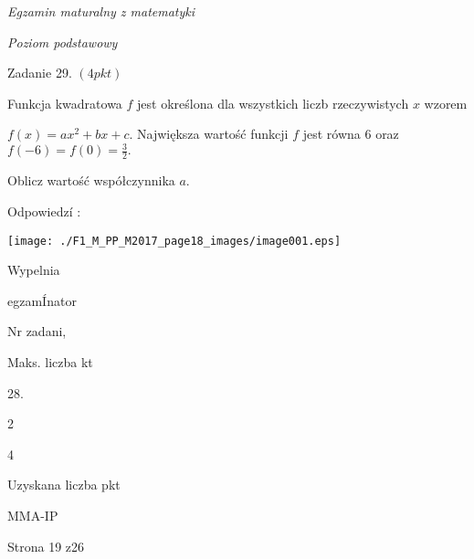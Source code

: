 \documentclass[a4paper,12pt]{article}
\begin{document}
{\it Egzamin maturalny z matematyki}

{\it Poziom podstawowy}

Zadanie 29. $(4pkt)$

Funkcja kwadratowa $f$ jest określona dla wszystkich liczb rzeczywistych $x$ wzorem

$f(x)=ax^{2}+bx+c$. Największa wartość funkcji $f$ jest równa 6 oraz $f(-6)=f(0)=\displaystyle \frac{3}{2}.$

Oblicz wartość współczynnika $a.$

Odpowiedzí :
\begin{center}
\texttt{[image: ./F1\_M\_PP\_M2017\_page18\_images/image001.eps]}
\end{center}
Wypelnia

egzamÍnator

Nr zadani,

Maks. liczba kt

28.

2

4

Uzyskana liczba pkt

MMA-IP

Strona 19 z26
\end{document}
